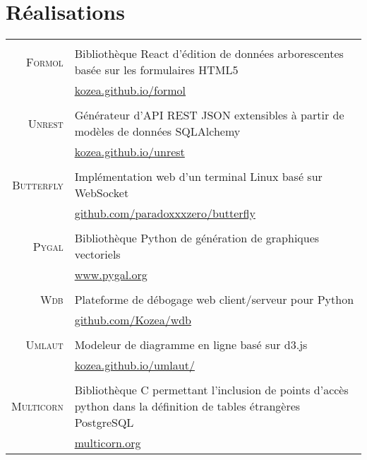 \documentclass[a4paper,10pt]{article}
\begin{document}
  \section{Réalisations}
  \begin{tabular}{r|p{11cm}}
    \multicolumn{2}{c}{} \\
    \textsc{Formol}
      & Bibliothèque React d’édition de données arborescentes basée sur les formulaires HTML5 \\
      & \href{https://kozea.github.io/formol/}{kozea.github.io/formol} \\

    \multicolumn{2}{c}{} \\
    \textsc{Unrest}
      & Générateur d’API REST JSON extensibles à partir de modèles de données SQLAlchemy \\
      & \href{https://kozea.github.io/unrest/}{kozea.github.io/unrest} \\

    \multicolumn{2}{c}{} \\
    \textsc{Butterfly}
      & Implémentation web d’un terminal Linux basé sur WebSocket \\
      & \href{https://github.com/paradoxxxzero/butterfly}{github.com/paradoxxxzero/butterfly} \\

    \multicolumn{2}{c}{} \\
    \textsc{Pygal}
      & Bibliothèque Python de génération de graphiques vectoriels \\
      & \href{http://www.pygal.org/}{www.pygal.org} \\

    \multicolumn{2}{c}{} \\
    \textsc{Wdb}
      & Plateforme de débogage web client/serveur pour Python \\
      & \href{https://github.com/Kozea/wdb}{github.com/Kozea/wdb} \\

    \multicolumn{2}{c}{} \\
    \textsc{Umlaut}
      & Modeleur de diagramme en ligne basé sur d3.js \\
      & \href{http://kozea.github.io/umlaut/}{kozea.github.io/umlaut/} \\

    \multicolumn{2}{c}{} \\
    \textsc{Multicorn}
      & Bibliothèque C permettant l’inclusion de points d’accès python dans la définition de tables étrangères PostgreSQL \\
      & \href{https://multicorn.org/}{multicorn.org} \\


\end{tabular}
\end{document}
